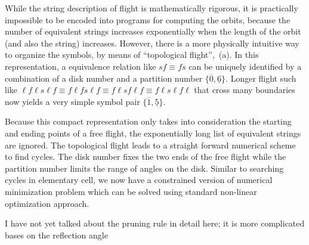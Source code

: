 While the string description of flight is mathematically rigorous, it is
practically impossible to be encoded into programs for computing the orbits,
because the number of equivalent strings increases exponentially when the length
of the orbit (and also the string) increases. However, there is a more
physically intuitive way to organize the symbols, by means of ``topological
flight'', \,(a). In this representation, a equivalence
relation like $sf\equiv fs$ can be uniquely identified by a combination of a
disk number and a partition number $\{\overline{0},\underline{6}\}$. Longer
flight such like $\ell f \ell s \ell f \equiv  f \ell f s \ell f \equiv f \ell s
f \ell f \equiv f \ell s \ell f \ell$ that cross many boundaries now yields a
very simple symbol pair $\{\overline{1},\underline{5}\}$. 

Because this compact representation only takes into consideration the starting
and ending points of a free flight, the exponentially long list of equivalent
strings are ignored. The topological flight leads to a straight forward
numerical scheme to find cycles. The disk number fixes the two ends of the free
flight while the partition number limits the range of angles on the disk.
Similar to searching cycles in elementary cell, we now have a constrained
version of numerical minimization problem which can be solved using standard
non-linear optimization approach.



    {I have not yet talked about the pruning rule in detail here; it is
    more complicated bases on the reflection angle}
